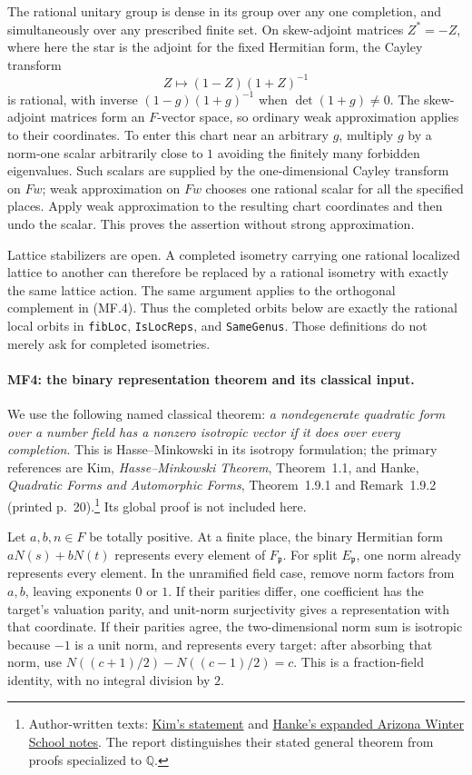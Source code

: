 The rational unitary group is dense in its group over any one
completion, and simultaneously over any prescribed finite set.
On skew-adjoint matrices \(Z^*=-Z\), where here the star is the
adjoint for the fixed Hermitian form, the Cayley transform
\[
             Z\longmapsto (1-Z)(1+Z)^{-1}              \tag{MF.5}
\]
is rational, with inverse \((1-g)(1+g)^{-1}\) when
\(\det(1+g)\ne0\). The skew-adjoint matrices form an \(F\)-vector
space, so ordinary weak approximation applies to their coordinates.
To enter this chart near an arbitrary \(g\), multiply \(g\) by a
norm-one scalar arbitrarily close to \(1\) avoiding the finitely
many forbidden eigenvalues. Such scalars are supplied by the
one-dimensional Cayley transform on \(Fw\); weak approximation on
\(Fw\) chooses one rational scalar for all the specified places.
Apply weak approximation
to the resulting chart coordinates and then undo the scalar.
This proves the assertion without strong approximation.

Lattice stabilizers are open. A completed isometry carrying one
rational localized lattice to another can therefore be replaced
by a rational isometry with exactly the same lattice action.
The same argument applies to the orthogonal complement in (MF.4).
Thus the completed orbits below are exactly the rational local
orbits in \texttt{fibLoc}, \texttt{IsLocReps}, and
\texttt{SameGenus}. Those definitions do not merely ask for completed
isometries.

\paragraph{MF4: the binary representation theorem and its classical input.}
We use the following named classical theorem:
\emph{a nondegenerate quadratic form over a number field has a nonzero
isotropic vector if it does over every completion}.
This is Hasse--Minkowski in its isotropy formulation; the
primary references are Kim, \emph{Hasse--Minkowski Theorem},
Theorem~1.1, and Hanke, \emph{Quadratic Forms and Automorphic Forms},
Theorem~1.9.1 and Remark~1.9.2 (printed p.~20).\footnote{Author-written
texts: \href{https://www.csun.edu/~sungjin/HasseMinkowski.pdf}{Kim's
statement} and \href{https://swc-math.github.io/aws/2009/09HankeNotes.pdf}{Hanke's
expanded Arizona Winter School notes}. The report distinguishes
their stated general theorem from proofs specialized to \(\mathbb Q\).}
Its global proof is not included here.

Let \(a,b,n\in F\) be totally positive. At a finite place, the binary
Hermitian form \(aN(s)+bN(t)\) represents every element of
\(F_{\mathfrak p}\).
For split \(E_{\mathfrak p}\), one norm already represents every
element. In the unramified field case, remove norm factors from
\(a,b\), leaving exponents \(0\) or \(1\).
If their parities differ, one coefficient has the target's valuation
parity, and unit-norm surjectivity gives a representation with that
coordinate. If their parities agree, the two-dimensional norm sum
is isotropic because \(-1\) is a unit norm, and represents every
target: after absorbing that norm, use
\(N((c+1)/2)-N((c-1)/2)=c\).
This is a fraction-field identity, with no integral division by \(2\).

